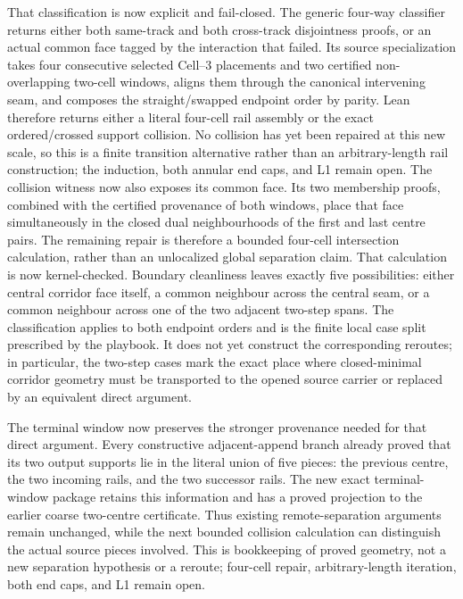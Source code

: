\documentclass[11pt]{article}
\theoremstyle{definition}
\begin{document}
That classification is now explicit and fail-closed.  The generic
four-way classifier returns either both same-track and both cross-track
disjointness proofs, or an actual common face tagged by the interaction that
failed.  Its source specialization takes four consecutive selected Cell--3
placements and two certified non-overlapping two-cell windows, aligns them
through the canonical intervening seam, and composes the straight/swapped
endpoint order by parity.  Lean therefore returns either a literal four-cell
rail assembly or the exact ordered/crossed support collision.  No collision
has yet been repaired at this new scale, so this is a finite transition
alternative rather than an arbitrary-length rail construction; the induction,
both annular end caps, and L1 remain open.
The collision witness now also exposes its common face.  Its two membership
proofs, combined with the certified provenance of both windows, place that
face simultaneously in the closed dual neighbourhoods of the first and last
centre pairs.  The remaining repair is therefore a bounded four-cell
intersection calculation, rather than an unlocalized global separation
claim.
That calculation is now kernel-checked.  Boundary cleanliness leaves exactly
five possibilities: either central corridor face itself, a common neighbour
across the central seam, or a common neighbour across one of the two adjacent
two-step spans.  The classification applies to both endpoint orders and is
the finite local case split prescribed by the playbook.  It does not yet
construct the corresponding reroutes; in particular, the two-step cases mark
the exact place where closed-minimal corridor geometry must be transported to
the opened source carrier or replaced by an equivalent direct argument.

The terminal window now preserves the stronger provenance needed for that
direct argument.  Every constructive adjacent-append branch already proved
that its two output supports lie in the literal union of five pieces: the
previous centre, the two incoming rails, and the two successor rails.  The
new exact terminal-window package retains this information and has a proved
projection to the earlier coarse two-centre certificate.  Thus existing
remote-separation arguments remain unchanged, while the next bounded
collision calculation can distinguish the actual source pieces involved.
This is bookkeeping of proved geometry, not a new separation hypothesis or a
reroute; four-cell repair, arbitrary-length iteration, both end caps, and L1
remain open.
\end{document}
